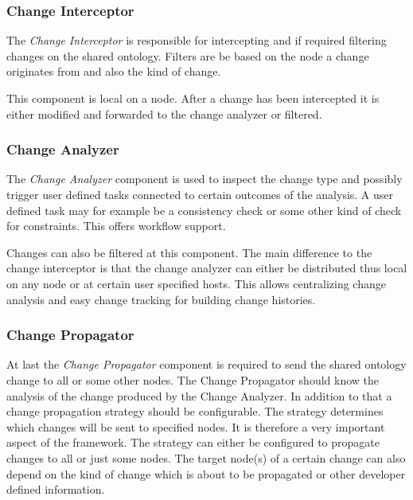 
\subsubsection{Change Interceptor}
The \emph{Change Interceptor} is responsible for intercepting and if required
filtering changes on the shared ontology. Filters are be based on the node
a change originates from and also the kind of change.

This component is local on a node. After a change has been intercepted
it is either modified and forwarded to the change analyzer or filtered.

\subsubsection{Change Analyzer}
The \emph{Change Analyzer} component is used to inspect the change type
and possibly trigger user defined tasks connected to certain outcomes of the
analysis. A user defined task may for example be a consistency check or some
other kind of check for constraints. This offers workflow support.

Changes can also be filtered at this component. The main difference to the
change interceptor is that the change analyzer can either be distributed thus 
local on any node or at certain user specified hosts. This allows centralizing
change analysis and easy change tracking for building change histories.

\subsubsection{Change Propagator}
\label{changepropagator}
At last the \emph{Change Propagator} component is required to send the
shared ontology change to all or some other nodes. The Change Propagator
should know the analysis of the change produced by the Change Analyzer.
In addition to that a change propagation strategy should be configurable. The
strategy determines which changes will be sent to specified nodes.
It is therefore a very important aspect of the framework. The strategy can either
be configured to propagate changes to all or just some nodes.
The target node(s) of a certain change can also depend on the kind of change
which is about to be propagated or other developer defined information.


